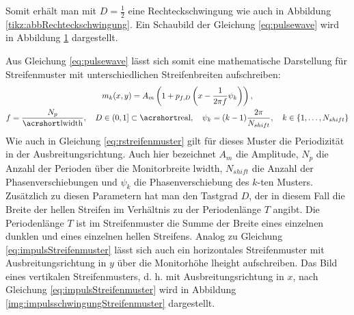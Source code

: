 Somit erhält man mit $D = \tfrac{1}{2}$ eine Rechteckschwingung wie auch in Abbildung \ref{tikz:abbRechteckschwingung}.
Ein Schaubild der Gleichung \ref{eq:pulsewave} wird in Abbildung \ref{tikz:abbNormalPulsewave} dargestellt.
%
{
	\begin{figure}[H]
		\centering
		
		\label{tikz:abbNormalPulsewave}
	\end{figure}
}
%
\noindent
Aus Gleichung \ref{eq:pulsewave} lässt sich somit eine mathematische Darstellung für Streifenmuster mit unterschiedlichen Streifenbreiten aufschreiben:
%
\begin{equation} \label{eq:impulsStreifenmuster}
	\begin{gathered}
		m_k(x,y) = A_m \left( 1 + p_{f,D}\left( x - \dfrac{1}{2 \pi f} \psi_k \right) \right),
		\\
		f = \dfrac{N_p}{\acrshortmath{lwidth}},
		\quad
		D \in \left(0,1\right] \subset \acrshortmath{real},
		\quad
		\psi_k = (k - 1)\dfrac{2\pi}{N_{shift}},
		\quad
		k \in \lbrace 1,\ldots,N_{shift}\rbrace
	\end{gathered}
\end{equation}
%
Wie auch in Gleichung \ref{eq:rstreifenmuster} gilt für dieses Muster die Periodizität in der Ausbreitungsrichtung.
Auch hier bezeichnet $A_m$ die Amplitude, $N_p$ die Anzahl der Perioden über die Monitorbreite \acrshort{lwidth}, $N_{shift}$ die Anzahl der Phasenverschiebungen und $\psi_k$ die Phasenverschiebung des $k$-ten Musters.
Zusätzlich zu diesen Parametern hat man den Tastgrad $D$, der in diesem Fall die Breite der hellen Streifen im Verhältnis zu der Periodenlänge $T$ angibt.
Die Periodenlänge $T$ ist im Streifenmuster die Summe der Breite eines einzelnen dunklen und eines einzelnen hellen Streifens.
Analog zu Gleichung \ref{eq:impulsStreifenmuster} lässt sich auch ein horizontales Streifenmuster mit Ausbreitungsrichtung in $y$ über die Monitorhöhe \acrshort{lheight} aufschreiben.
Das Bild eines vertikalen Streifenmusters, d. h. mit Ausbreitungsrichtung in $x$, nach Gleichung \ref{eq:impulsStreifenmuster} wird in Abbildung \ref{img:impulsschwingungStreifenmuster} dargestellt.
%
